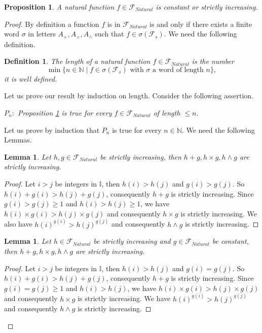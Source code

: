 \documentclass{alggeom}
\renewcommand{\geq}{\geqslant}
\renewcommand{\leq}{\leqslant}
\newtheorem{defi}[theo]{Definition}
\newtheorem{prop}[theo]{Proposition}
\newtheorem{lemm}[theo]{Lemma}
\newcommand{\N}{\mathbb{N}}
\newcommand{\I}{\mathbb{I}}
\begin{document}
\begin{prop} \label{increa} A natural function $f \in \mathscr{F} _{Natural}$ is constant or strictly increasing.

\end{prop}

\begin{proof} By definition a function $f $ is in $\mathscr{F} _{Natural}$ is and only if there exists a finite word $\sigma$ in letters $A_+ , A_{\times} , A_{\wedge}$ such that $f \in \sigma (\mathscr{F} _s )$.  We need the following definition.

\begin{defi} The length of a natural function $f \in \mathscr{F}_{Natural}$ is the number \[ \min \{n \in \N \mid  f \in \sigma (\mathscr{F}_s) \text{ with $\sigma$ a word of length $n$} \}, \] it is well defined.

\end{defi} Let us prove our result by induction on length. Consider the following assertion.
\begin{center}

 \textit{$P_n :$ Proposition \ref{increa} is true for every $f \in \mathscr{F}_{Natural}$ of length $\leq n$.}
\end{center}
 
 Let us prove by induction that $P_n$ is true for every $n \in \N$. We need the following Lemmas.
 
  \begin{lemm} \label{lem0} Let $h,g \in \mathscr{F}_{Natural}$ be strictly increasing, then $h+g , h\times g , h \wedge g  $ are strictly increasing.
\end{lemm} 
\begin{proof}
Let $i>j$ be integers in $\I$, then $h(i)>h(j)$ and $g(i)> g (j)$. So $h(i)+g(i) > h(j)+g(j)$, consequently $h+g$ is strictly increasing. Since $ g(i) > g(j) \geq 1 $ and $h(i) > h(j) \geq 1$, we have $h(i)\times g(i) > h(j)\times g(j)$ and consequently $h\times g $ is strictly increasing. We also have $h(i)^{g(i)} > h(j) ^{g(j)}$ and consequently $h \wedge g$ is strictly increasing.
\end{proof} 
 
  \begin{lemm} \label{lem1} Let $h \in \mathscr{F}_{Natural}$ be strictly increasing and $g  \in \mathscr{F} _{Natural}$ be constant, then $h+g , h\times g , h \wedge g  $ are strictly increasing.
\end{lemm} 
\begin{proof}
Let $i>j$ be integers in $\I$, then $h(i)>h(j)$ and $g(i)= g (j)$. So $h(i)+g(i) > h(j)+g(j)$, consequently $h+g$ is strictly increasing. Since $g(i) = g(j) \geq 1$ and $h(i) > h(j)$, we have $h(i)\times g(i) > h(j)\times g(j)$ and consequently $h\times g $ is strictly increasing. We have $h(i)^{g(i)} > h(j) ^{g(j)}$ and consequently $h \wedge g$ is strictly increasing.
\end{proof} 


\end{proof}
\end{document}

